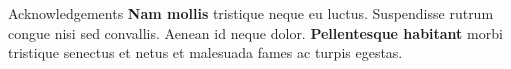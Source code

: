 \documentclass{beamer} %
\begin{document}
\begin{frame}[t]
\begin{columns}[t]
\begin{column}{0.3\textwidth}

			\begin{block}{Acknowledgements}
				\textbf{Nam mollis} tristique neque eu luctus. Suspendisse rutrum congue nisi sed convallis. Aenean id neque dolor. \textbf{Pellentesque habitant} morbi tristique senectus et netus et malesuada fames ac turpis egestas.
			\end{block}




\end{column}
\end{columns}
\end{frame}
\end{document}
